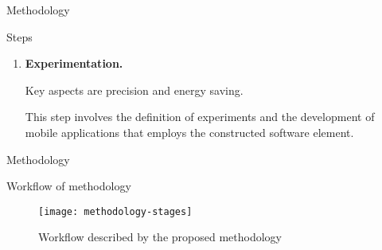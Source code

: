 \begin{frame}{Methodology}
\begin{block}{Steps}
\begin{enumerate}
      \item \textbf{Experimentation.}

        Key aspects are precision and energy saving.
        
        
        
        This step involves the definition of experiments and the development of mobile applications that employs the constructed software element.


    \end{enumerate}
  \end{block}
\end{frame}


\begin{frame}{Methodology}
  \begin{block}{Workflow of methodology}
    \begin{figure}
      \centering
      \texttt{[image: methodology-stages]}
      \caption[Methodology workflow]{Workflow described by the proposed methodology}
      \label{fig-methodology-workflow}
    \end{figure}
  \end{block}
\end{frame}